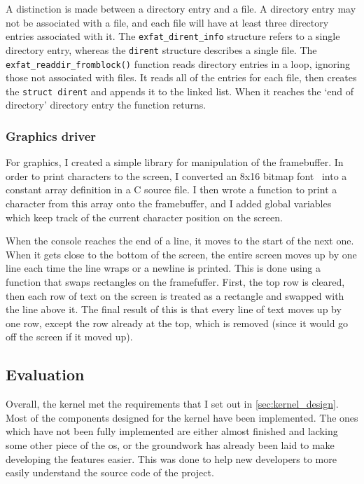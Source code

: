 \documentclass{article}
\begin{document}
A distinction is made between a directory entry and a file. A directory entry
may not be associated with a file, and each file will have at least three
directory entries associated with it. The \verb!exfat_dirent_info! structure
refers to a single directory entry, whereas the \verb!dirent! structure
describes a single file. The \verb!exfat_readdir_fromblock()! function reads
directory entries in a loop, ignoring those not associated with files. It reads
all of the entries for each file, then creates the \verb!struct dirent! and
appends it to the linked list. When it reaches the `end of directory' directory
entry the function returns.

\subsubsection{Graphics driver}
\label{sec:impl_graphics}
For graphics, I created a simple library for manipulation of the framebuffer.
In order to print characters to the screen, I converted an 8x16 bitmap
font~\cite{bizcat-font} into a constant array definition in a C source file. I
then wrote a function to print a character from this array onto the
framebuffer, and I added global variables which keep track of the current
character position on the screen.

When the console reaches the end of a line, it moves to the start of the next
one. When it gets close to the bottom of the screen, the entire screen moves up
by one line each time the line wraps or a newline is printed. This is done
using a function that swaps rectangles on the framefuffer. First, the top row
is cleared, then each row of text on the screen is treated as a rectangle and
swapped with the line above it. The final result of this is that every line of
text moves up by one row, except the row already at the top, which is removed
(since it would go off the screen if it moved up).

\subsection{Evaluation}
Overall, the kernel met the requirements that I set out in
\autoref{sec:kernel_design}. Most of the components designed for the kernel
have been implemented. The ones which have not been fully implemented are
either almost finished and lacking some other piece of the \gls{os}, or the
groundwork has already been laid to make developing the features easier. This
was done to help new developers to more easily understand the source code of
the project.
\end{document}

